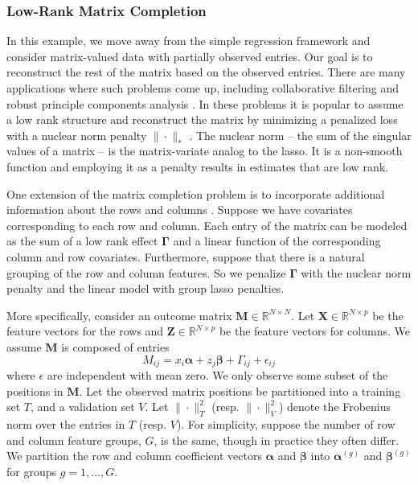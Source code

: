 \documentclass[12pt]{article}
\begin{document}
\subsubsection{Low-Rank Matrix Completion}\label{sec:matrix_completion}

In this example, we move away from the simple regression framework and consider matrix-valued data with partially observed entries. Our goal is to reconstruct the rest of the matrix based on the observed entries. There are many applications where such problems come up, including collaborative filtering \citep{netflix} and robust principle components analysis \citep{candes2011robust}. 
In these problems it is popular to assume a low rank structure and reconstruct the matrix by minimizing a penalized loss with a nuclear norm penalty $\|\cdot \|_*$ \citep{fazel2002matrix, srebro2004learning}. The nuclear norm -- the sum of the singular values of a matrix -- is the matrix-variate analog to the lasso. It is a non-smooth function and employing it as a penalty results in estimates that are low rank.

One extension of the matrix completion problem is to incorporate additional information about the rows and columns \citep{fithian2013scalable}. Suppose we have covariates corresponding to each row and column. Each entry of the matrix can be modeled as the sum of a low rank effect $\boldsymbol{\Gamma}$ and a linear function of the corresponding column and row covariates. Furthermore, suppose that there is a natural grouping of the row and column features. So we penalize $\boldsymbol{\Gamma}$ with the nuclear norm penalty and the linear model with group lasso penalties.

More specifically, consider an outcome matrix $\boldsymbol{M} \in \mathbb{R}^{N\times N}$. Let $\boldsymbol{X}\in \mathbb{R}^{N \times p}$ be the feature vectors for the rows and $\boldsymbol{Z} \in \mathbb{R}^{N \times p}$ be the feature vectors for columns. We assume $\boldsymbol{M}$ is composed of entries
\begin{equation}
M_{ij} = x_i \boldsymbol{\alpha} + z_j \boldsymbol{\beta} + \Gamma_{ij} + \epsilon_{ij}
\end{equation}
where $\epsilon$ are independent with mean zero. We only observe some subset of the positions in $\boldsymbol{M}$. Let the observed matrix positions be partitioned into a training set $T$, and a validation set $V$. Let $\| \cdot \|^2_T$ (resp. $\| \cdot \|^2_V$) denote the Frobenius norm over the entries in $T$ (resp. $V$). For simplicity, suppose the number of row and column feature groups, $G$, is the same, though in practice they often differ. We partition the row and column coefficient vectors $\boldsymbol{\alpha}$ and $\boldsymbol{\beta}$ into $\boldsymbol{\alpha}^{(g)}$ and $\boldsymbol{\beta}^{(g)}$ for groups $g=1,...,G$. 
\end{document}
